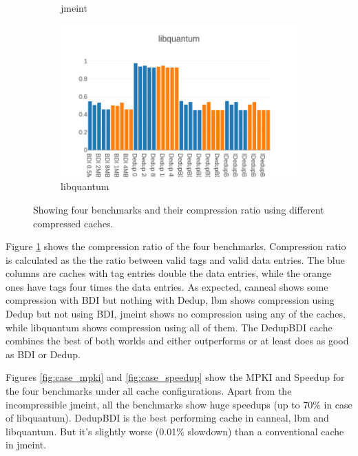 \begin{figure}
\begin{subfigure}{0.5\textwidth}
        \caption{jmeint}
    \end{subfigure}
    \begin{subfigure}{0.5\textwidth}
        \includegraphics[width=\textwidth]{libquantum-compratio.png}
        \caption{libquantum}
    \end{subfigure}
    \caption[Case Study: Compression]{Showing four benchmarks and their compression ratio using different compressed caches.}
    \label{fig:case_compratio}
\end{figure}
Figure \ref{fig:case_compratio} shows the compression ratio of the four benchmarks. Compression ratio is calculated as the the ratio between valid tags and valid data entries. The blue columns are caches with tag entries double the data entries, while the orange ones have tags four times the data entries. As expected, canneal shows some compression with BDI but nothing with Dedup, lbm shows compression using Dedup but not using BDI, jmeint shows no compression using any of the caches, while libquantum shows compression using all of them. The DedupBDI cache combines the best of both worlds and either outperforms or at least does as good as BDI or Dedup.\par
Figures \ref{fig:case_mpki} and \ref{fig:case_speedup} show the MPKI and Speedup for the four benchmarks under all cache configurations. Apart from the incompressible jmeint, all the benchmarks show huge speedups (up to 70\% in case of libquantum). DedupBDI is the best performing cache in canneal, lbm and libquantum. But it's slightly worse (0.01\% slowdown) than a conventional cache in jmeint.

